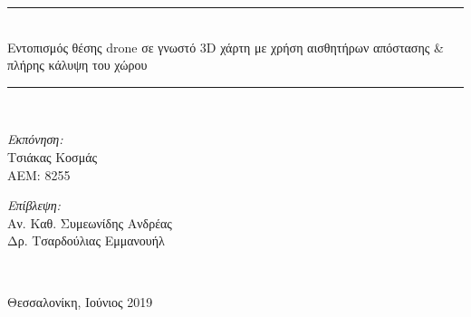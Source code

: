 \begin{titlepage}
\begin{center}
    \rule{450pt}{4pt} \\[0.4cm]
    {\fontsize{20.26pt}{1em}\selectfont Εντοπισμός θέσης drone σε γνωστό 3D χάρτη με χρήση αισθητήρων απόστασης \& πλήρης κάλυψη του χώρου}

    \rule{350pt}{4pt} \\[4cm]

    \begin{minipage}{0.4\textwidth}
      \begin{flushleft} \large
        \emph{Εκπόνηση:} \\
        Τσιάκας Κοσμάς \\
        ΑΕΜ: 8255
      \end{flushleft}
    \end{minipage}
    \begin{minipage}{0.4\textwidth}
      \begin{flushright} \large
        \emph{Επίβλεψη:} \\
        Αν. Καθ. Συμεωνίδης Ανδρέας\\
        Δρ. Τσαρδούλιας Εμμανουήλ \\
      \end{flushright}
    \end{minipage}
    \\[1cm]
    \vfill

    \large Θεσσαλονίκη, Ιούνιος 2019

  \end{center}
\end{titlepage}
